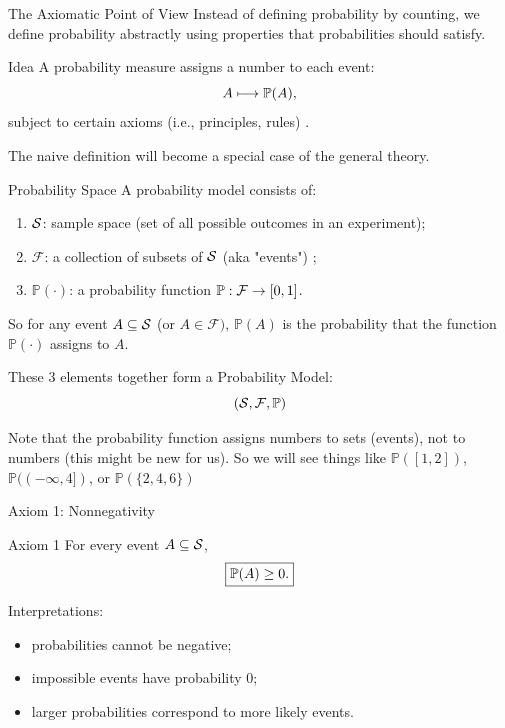 \begin{frame}{The Axiomatic Point of View}
Instead of defining probability by counting, we define probability abstractly using properties that probabilities should satisfy.

\vspace{0.3cm}

\begin{keybox}{Idea}
A probability measure assigns a number to each event:
\[
A \longmapsto \mathbb{P}(A),
\]
subject to certain axioms (i.e., principles, rules) .
\end{keybox}

\vspace{0.3cm}

The naive definition will become a special case of the general theory.
\end{frame}


\begin{frame}{Probability Space}
A probability model consists of:

\begin{enumerate}
    \item $\mathcal{S}$: sample space  (set of all possible outcomes in an experiment);
    \item $\mathcal{F} $: a collection of subsets of $\mathcal{S}$ (aka "events") ;
    \item $\mathbb{P}(\cdot)$: a probability function $\mathbb{P}: \mathcal{F}\to [0,1]$.
\end{enumerate}

\vspace{0.25cm}

So for any event $A\subseteq \mathcal{S}$ (or $A\in \mathcal{F})$, $\mathbb{P}(A)$ is the probability that the function $\mathbb{P}(\cdot)$ assigns to $A$.



These 3 elements together form a Probability Model:
$$(\mathcal{S} , \mathcal{F}, \mathbb{P})$$

Note that the probability function assigns numbers to sets (events), not to numbers (this might be new for us). So we will see things like $\mathbb{P}([1,2])$, $\mathbb{P}((-\infty, 4])$, or $\mathbb{P}(\{ 2,4,6\} )$

\end{frame}

\begin{frame}{Axiom 1: Nonnegativity}
\begin{keybox}{Axiom 1}
For every event $A\subseteq \mathcal{S}$,
\[
\boxed{\mathbb{P}(A)\geq0.}
\]
\end{keybox}

\vspace{0.3cm}

Interpretations:
\begin{itemize}
    \item probabilities cannot be negative;
    \item impossible events have probability $0$;
    \item larger probabilities correspond to more likely events.
\end{itemize}
\end{frame}

